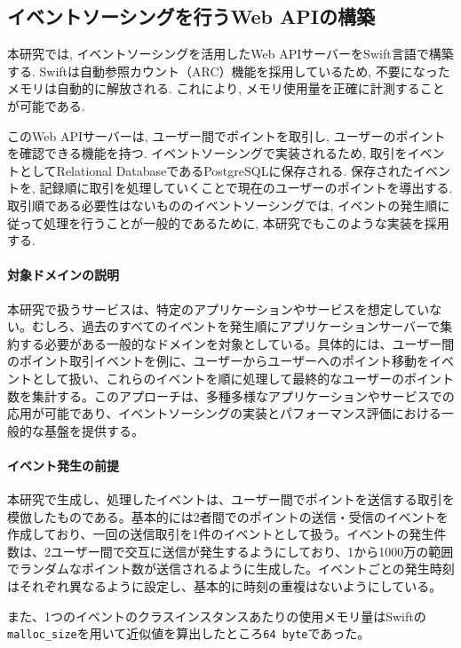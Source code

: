 \documentclass[../../../main]{subfiles}
\begin{document}
    \subsection{イベントソーシングを行うWeb APIの構築}\label{subsec:method-event_sourcing_api}

    本研究では, イベントソーシングを活用したWeb APIサーバーをSwift言語で構築する. Swiftは自動参照カウント（ARC）機能を採用しているため, 不要になったメモリは自動的に解放される. これにより, メモリ使用量を正確に計測することが可能である.

    このWeb APIサーバーは, ユーザー間でポイントを取引し, ユーザーのポイントを確認できる機能を持つ. イベントソーシングで実装されるため, 取引をイベントとしてRelational DatabaseであるPostgreSQLに保存される. 保存されたイベントを, 記録順に取引を処理していくことで現在のユーザーのポイントを導出する. 取引順である必要性はないもののイベントソーシングでは, イベントの発生順に従って処理を行うことが一般的であるために, 本研究でもこのような実装を採用する.

    \paragraph{対象ドメインの説明}
    本研究で扱うサービスは、特定のアプリケーションやサービスを想定していない。むしろ、過去のすべてのイベントを発生順にアプリケーションサーバーで集約する必要がある一般的なドメインを対象としている。具体的には、ユーザー間のポイント取引イベントを例に、ユーザーからユーザーへのポイント移動をイベントとして扱い、これらのイベントを順に処理して最終的なユーザーのポイント数を集計する。このアプローチは、多種多様なアプリケーションやサービスでの応用が可能であり、イベントソーシングの実装とパフォーマンス評価における一般的な基盤を提供する。

    \paragraph{イベント発生の前提}
    本研究で生成し、処理したイベントは、ユーザー間でポイントを送信する取引を模倣したものである。基本的には2者間でのポイントの送信・受信のイベントを作成しており、一回の送信取引を1件のイベントとして扱う。イベントの発生件数は、2ユーザー間で交互に送信が発生するようにしており、1から1000万の範囲でランダムなポイント数が送信されるように生成した。イベントごとの発生時刻はそれぞれ異なるように設定し、基本的に時刻の重複はないようにしている。

    また、1つのイベントのクラスインスタンスあたりの使用メモリ量はSwiftの\texttt{malloc\_size}を用いて近似値を算出したところ\texttt{64 byte}であった。
\end{document}
